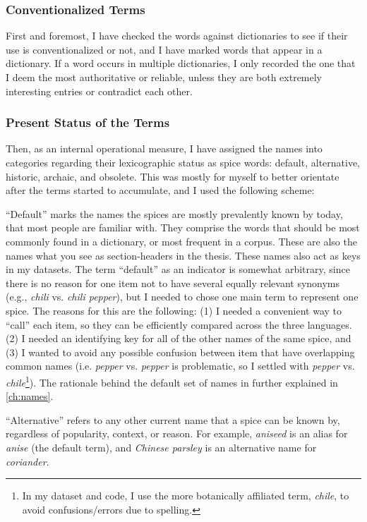 \subsubsection{Conventionalized Terms}

First and foremost, I have checked the words against dictionaries to see if their use is conventionalized or not, and I have marked words that appear in a dictionary. If a word occurs in multiple dictionaries, I only recorded the one that I deem the most authoritative or reliable, unless they are both extremely interesting entries or contradict each other.

\subsubsection{Present Status of the Terms}

Then, as an internal operational measure, I have assigned the names into categories regarding their lexicographic status as spice words: default, alternative, historic, archaic, and obsolete. This was mostly for myself to better orientate after the terms started to accumulate, and I used the following scheme: 

``Default'' marks the names the spices are mostly prevalently known by today, that most people are familiar with. They comprise the words that should be most commonly found in a dictionary, or most frequent in a corpus. These are also the names what you see as section-headers in the thesis. These names also act as keys in my datasets. The term ``default'' as an indicator is somewhat arbitrary, since there is no reason for one item not to have several equally relevant synonyms (e.g., \textit{chili} vs. \textit{chili pepper}), but I needed to chose one main term to represent one spice. The reasons for this are the following: (1) I needed a convenient way to ``call'' each item, so they can be efficiently compared across the three languages. (2) I needed an identifying key for all of the other names of the same spice, and (3) I wanted to avoid any possible confusion between item that have overlapping common names (i.e. \textit{pepper} vs. \textit{pepper} is problematic, so I settled with \textit{pepper} vs. \textit{chile}\footnote{In my dataset and code, I use the more botanically affiliated term, \textit{chile}, to avoid confusions/errors due to spelling.}). The rationale behind the default set of names in further explained in \cref{ch:names}.

``Alternative'' refers to any other current name that a spice can be known by, regardless of popularity, context, or reason. For example, \textit{aniseed} is an alias for \textit{anise} (the default term), and \textit{Chinese parsley} is an alternative name for \textit{coriander}. 

